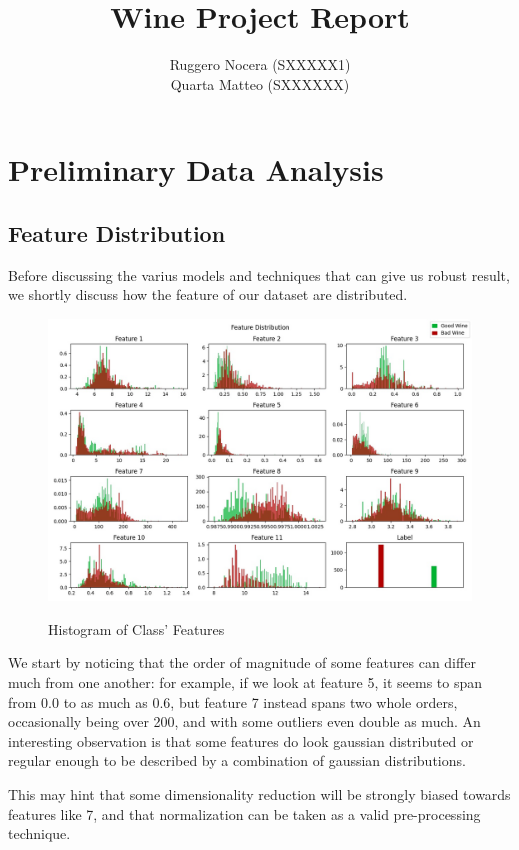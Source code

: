 \documentclass[12pt, twocolumn]{article}
\title{Wine Project Report}
\author{Ruggero Nocera (SXXXXX1) \\ Quarta Matteo (SXXXXXX)}
\date{}
\begin{document}
\maketitle
\begin{strip}
    \lipsum[1]
\end{strip}
\tableofcontents


\section{Preliminary Data Analysis}
\subsection{Feature Distribution}

Before discussing the varius models and techniques that can give us robust result, we shortly discuss how the feature of our dataset are distributed.

\begin{figure}[H]
    \caption{Histogram of Class' Features}
    {\includegraphics[width=\linewidth]{dist.jpg}}
    \label{featureshist}
\end{figure}

We start by noticing that the order of magnitude of some features can differ much from one another: for example, if we look at feature 5, it seems to span from 0.0 to as much as 0.6, but feature 7 instead spans two whole orders, occasionally being over 200, and with some outliers even double as much. An interesting observation is that some features do look gaussian distributed or regular enough to be described by a combination of gaussian distributions.

This may hint that some dimensionality reduction will be strongly biased towards features like 7, and that normalization can be taken as a valid pre-processing technique.
\end{document}
